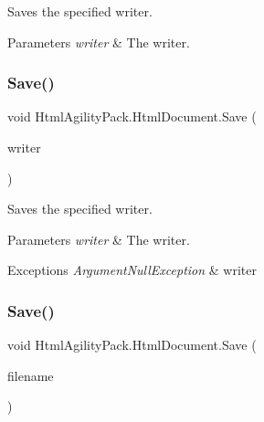 Saves the specified writer. 


\begin{DoxyParams}{Parameters}
{\em writer} & The writer.\\
\hline
\end{DoxyParams}
\mbox{\label{class_html_agility_pack_1_1_html_document_a807a732ac65a41587c17bbb9effabd68}} 
\subsubsection{\texorpdfstring{Save()}{Save()}\hspace{0.1cm}{\footnotesize\ttfamily [3/7]}}
{\footnotesize\ttfamily void Html\+Agility\+Pack.\+Html\+Document.\+Save (\begin{DoxyParamCaption}\item[{Text\+Writer}]{writer }\end{DoxyParamCaption})\hspace{0.3cm}{\ttfamily [inline]}}



Saves the specified writer. 


\begin{DoxyParams}{Parameters}
{\em writer} & The writer.\\
\hline
\end{DoxyParams}

\begin{DoxyExceptions}{Exceptions}
{\em Argument\+Null\+Exception} & writer\\
\hline
\end{DoxyExceptions}
\mbox{\label{class_html_agility_pack_1_1_html_document_a5f1fa7de7fc1667c52aeb2bdd67e4a35}} 
\subsubsection{\texorpdfstring{Save()}{Save()}\hspace{0.1cm}{\footnotesize\ttfamily [4/7]}}
{\footnotesize\ttfamily void Html\+Agility\+Pack.\+Html\+Document.\+Save (\begin{DoxyParamCaption}\item[{string}]{filename }\end{DoxyParamCaption})\hspace{0.3cm}{\ttfamily [inline]}}



